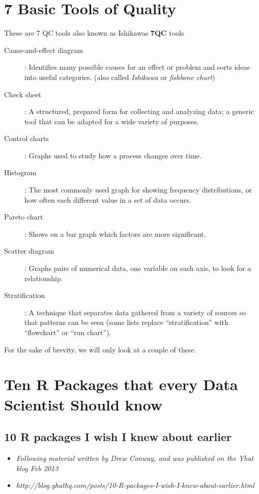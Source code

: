 \documentclass[]{report}
\begin{document}
\section{7 Basic Tools of Quality }
{\large
	These are 7 QC tools also known as Ishikawas \textbf{7QC} tools
	\begin{description}
		\item[Cause-and-effect diagram]: Identifies many possible causes for an effect or problem and sorts ideas into useful categories.
		(also called \textit{Ishikawa} or\textit{ fishbone chart})
		
		\item[Check sheet]: A structured, prepared form for collecting and analyzing data; a generic tool that can be adapted for a wide variety of purposes.
		
		\item[Control charts]: Graphs used to study how a process changes over time.
		
		\item[Histogram]: The most commonly used graph for showing frequency distributions, or how often each different value in a set of data occurs.
		
		\item[Pareto chart]: Shows on a bar graph which factors are more significant.
		
		\item[Scatter diagram]: Graphs pairs of numerical data, one variable on each axis, to look for a relationship.
		
		\item[Stratification]: A technique that separates data gathered from a variety of sources so that patterns can be seen (some lists replace “stratification” with “flowchart” or “run chart”).
	\end{description}
	For the sake of brevity, we will only look at a couple of these.
}

\section{Ten R Packages that every Data Scientist Should know}

\subsection{10 R packages I wish I knew about earlier}
\begin{itemize}
	\item \textit{Following material written by Drew Conway, and was published on the Yhat blog Feb 2013} \item \textit{http://blog.yhathq.com/posts/10-R-packages-I-wish-I-knew-about-earlier.html}
\end{itemize}
\end{document}
